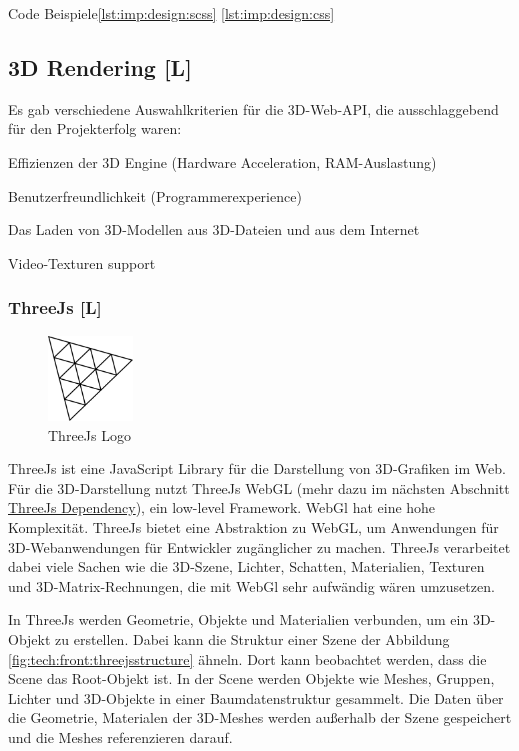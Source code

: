Code Beispiele\ref{lst:imp:design:scss} \ref{lst:imp:design:css} \cite[Sass Guide]{SassGuide}


\subsection{3D Rendering [L]}
Es gab verschiedene Auswahlkriterien für die 3D-Web-API, die ausschlaggebend für den Projekterfolg waren:
\begin{compactitem}
  \item Effizienzen der 3D Engine (Hardware Acceleration, RAM-Auslastung)
  \item Benutzerfreundlichkeit (Programmerexperience)
  \item Das Laden von 3D-Modellen aus 3D-Dateien und aus dem Internet
  \item Video-Texturen support
\end{compactitem}

\subsubsection{ThreeJs [L]}
\begin{figure}
    \begin{center}
      \includegraphics[width=0.2\textwidth]{pics/threeJS.png}
     \caption{ThreeJs Logo}
    \end{center}
\end{figure}
ThreeJs ist eine JavaScript Library für die Darstellung von 3D-Grafiken im Web. Für die 3D-Darstellung nutzt ThreeJs WebGL (mehr dazu im nächsten Abschnitt \hyperref[ch::ThreeJsDependency]{ThreeJs Dependency}), ein low-level Framework. WebGl hat eine hohe Komplexität. ThreeJs bietet eine Abstraktion zu WebGL, um Anwendungen für 3D-Webanwendungen für Entwickler zugänglicher zu machen. ThreeJs verarbeitet dabei viele Sachen wie die 3D-Szene, Lichter, Schatten, Materialien, Texturen und 3D-Matrix-Rechnungen, die mit WebGl sehr aufwändig wären umzusetzen.

In ThreeJs werden Geometrie, Objekte und Materialien verbunden, um ein 3D-Objekt zu erstellen. Dabei kann die Struktur einer Szene der Abbildung \ref{fig:tech:front:threejsstructure} ähneln. Dort kann beobachtet werden, dass die Scene das Root-Objekt ist. In der Scene werden Objekte wie Meshes, Gruppen, Lichter und 3D-Objekte in einer Baumdatenstruktur gesammelt. Die Daten über die Geometrie, Materialen der 3D-Meshes werden außerhalb der Szene gespeichert und die Meshes referenzieren darauf.

